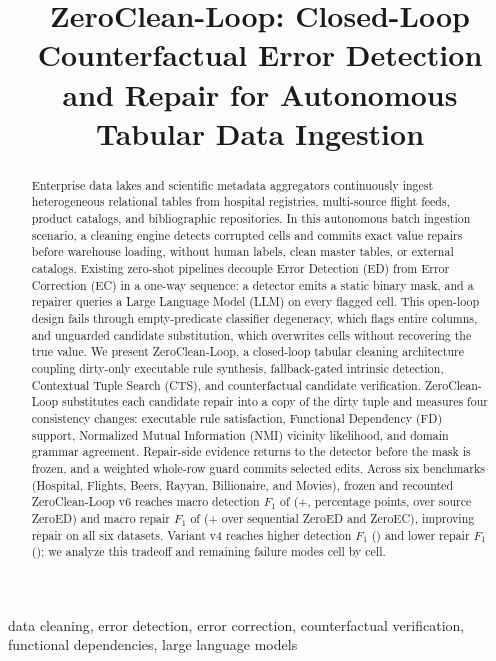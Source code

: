 \documentclass[conference]{IEEEtran}
\title{ZeroClean-Loop: Closed-Loop Counterfactual Error Detection and Repair for Autonomous Tabular Data Ingestion}
\author{
\IEEEauthorblockN{Yaoning Liu}
\IEEEauthorblockA{\textit{Beijing University of Posts and Telecommunications}, Beijing, China \\
1652141467@qq.com \quad ORCID: 0009-0003-2754-9159}
}
\begin{document}
\maketitle

\begin{abstract}
Enterprise data lakes and scientific metadata aggregators continuously ingest heterogeneous relational tables from hospital registries, multi-source flight feeds, product catalogs, and bibliographic repositories. In this autonomous batch ingestion scenario, a cleaning engine detects corrupted cells and commits exact value repairs before warehouse loading, without human labels, clean master tables, or external catalogs. Existing zero-shot pipelines decouple Error Detection (ED) from Error Correction (EC) in a one-way sequence: a detector emits a static binary mask, and a repairer queries a Large Language Model (LLM) on every flagged cell. This open-loop design fails through empty-predicate classifier degeneracy, which flags entire columns, and unguarded candidate substitution, which overwrites cells without recovering the true value. We present ZeroClean-Loop, a closed-loop tabular cleaning architecture coupling dirty-only executable rule synthesis, fallback-gated intrinsic detection, Contextual Tuple Search (CTS), and counterfactual candidate verification. ZeroClean-Loop substitutes each candidate repair into a copy of the dirty tuple and measures four consistency changes: executable rule satisfaction, Functional Dependency (FD) support, Normalized Mutual Information (NMI) vicinity likelihood, and domain grammar agreement. Repair-side evidence returns to the detector before the mask is frozen, and a weighted whole-row guard commits selected edits. Across six benchmarks (Hospital, Flights, Beers, Rayyan, Billionaire, and Movies), frozen and recounted ZeroClean-Loop v6 reaches macro detection $F_1$ of \VsixMacroED{} (+\VsixEDGain{}, percentage points, over source ZeroED) and macro repair $F_1$ of \VsixMacroRepair{} (+\VsixRepairGain{} over sequential ZeroED and ZeroEC), improving repair on all six datasets. Variant v4 reaches higher detection $F_1$ (\VfourMacroED{}) and lower repair $F_1$ (\VfourMacroRepair{}); we analyze this tradeoff and remaining failure modes cell by cell.
\end{abstract}

\begin{IEEEkeywords}
data cleaning, error detection, error correction, counterfactual verification, functional dependencies, large language models
\end{IEEEkeywords}
\end{document}
